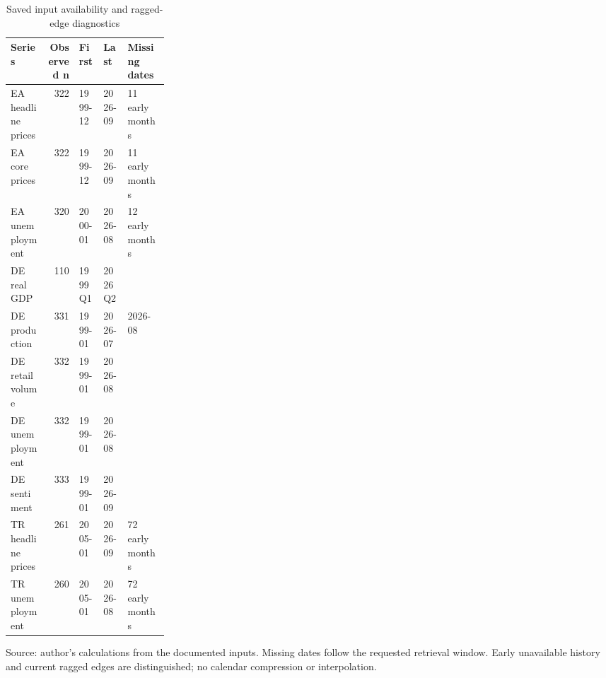 \begin{table}[htbp]
\centering
\footnotesize
\caption{Saved input availability and ragged-edge diagnostics}
\begin{tabularx}{\linewidth}{Xrllp{0.26\linewidth}}
\toprule
Series & Observed n & First & Last & Missing dates \\
\midrule
EA headline prices & 322 & 1999-12 & 2026-09 & 11 early months \\
EA core prices & 322 & 1999-12 & 2026-09 & 11 early months \\
EA unemployment & 320 & 2000-01 & 2026-08 & 12 early months \\
DE real GDP & 110 & 1999Q1 & 2026Q2 &  \\
DE production & 331 & 1999-01 & 2026-07 & 2026-08 \\
DE retail volume & 332 & 1999-01 & 2026-08 &  \\
DE unemployment & 332 & 1999-01 & 2026-08 &  \\
DE sentiment & 333 & 1999-01 & 2026-09 &  \\
TR headline prices & 261 & 2005-01 & 2026-09 & 72 early months \\
TR unemployment & 260 & 2005-01 & 2026-08 & 72 early months \\
\bottomrule
\end{tabularx}
\par\vspace{3pt}\begin{minipage}{\linewidth}\footnotesize Source: author's calculations from the documented inputs.\allowbreak{} Missing dates follow the requested retrieval window.\allowbreak{} Early unavailable history and current ragged edges are distinguished; no calendar compression or interpolation.\allowbreak{}\end{minipage}
\end{table}
